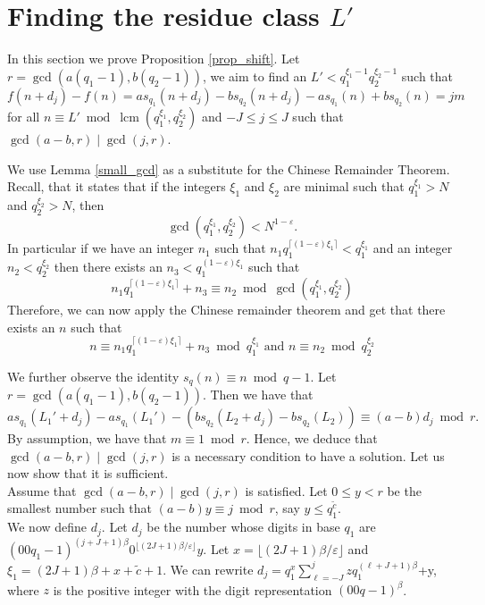 \documentclass[12pt]{amsart}
\renewcommand{\leq}{\leqslant}
\DeclareMathOperator{\lcm}{lcm}
\theoremstyle{definition}
\numberwithin{equation}{section}
\numberwithin{equation}{section}
\begin{document}
\section{Finding the residue class $L'$} \label{sec_Proof_of_claims}
In this section we prove Proposition \ref{prop_shift}. Let $r= \gcd(a(q_1-1),b(q_2-1))$, we aim to find an $L'<q_1^{\xi_{1}-1}q_2^{\xi_{2}-1}$ such that
\begin{equation}\label{eq_def_f}
	f(n+d_j)-f(n) = as_{q_1}(n+d_j)-bs_{q_2}(n+d_j)-as_{q_1}(n)+bs_{q_2}(n) = jm
\end{equation}
for all $n\equiv L' \bmod \lcm(q_1^{\xi_{1}},q_2^{\xi_{2}})$ and $-J\leq j \leq J$ such that $\gcd(a-b,r)\mid\gcd(j,r)$.

We use Lemma \ref{small_gcd} as a substitute for the Chinese Remainder Theorem. Recall, that it states that if the integers $\xi_1$ and $\xi_2$ are minimal such that $q_1^{\xi_1}>N$ and $q_2^{\xi_2}>N$, then
\[
	\gcd(q_1^{\xi_1}, q_2^{\xi_2})< N^{1-\varepsilon}.
\]
In particular if we have an integer $n_1$ such that $n_1q_1^{\lceil(1-\varepsilon)\xi_1\rceil}<q_1^{\xi_1}$ and an integer $n_2<q_2^{\xi_2}$ then there exists an $n_3<q_1^{(1-\varepsilon)\xi_1}$ such that
\[
	n_1q_1^{\lceil(1-\varepsilon)\xi_1\rceil} + n_3 \equiv n_2 \bmod \gcd(q_1^{\xi_1}, q_2^{\xi_2})
\]
Therefore, we can now apply the Chinese remainder theorem and get that there exists an $n$ such that
\[ 
	n \equiv n_1q_1^{\lceil(1-\varepsilon)\xi_1\rceil}+n_3 \bmod q_1^{\xi_1} \text{ and } n \equiv n_2 \bmod q_2^{\xi_2}
\]

We further observe the identity $s_q(n)\equiv n \bmod q-1$. Let $r = \gcd(a(q_1-1), b(q_2-1))$. Then we have that
\[
as_{q_1}( L_1'+d_j)-as_{q_1}( L_1') - (bs_{q_2}( L_2+d_j)-bs_{q_2}( L_2)) \equiv (a-b)d_j \bmod r.
\]
By assumption, we have that $m\equiv 1 \bmod r$. Hence, we deduce that $\gcd(a-b, r) \mid \gcd (j, r)$ is a necessary condition to have a solution. Let us now show that it is sufficient.\\
Assume that $\gcd(a-b, r) \mid \gcd (j, r)$ is satisfied. Let $0 \leq y < r$ be the smallest number such that $(a-b)y \equiv j\bmod r$, say $y \leq q_1^{\tilde{c}}$.\\

We now define $d_j$. Let $d_j$ be the number whose digits in base $q_1$ are $(00\mathrel{{q_1}{-}{1}})^{(j+J+1)\beta}0^{\lfloor(2J+1)\beta/\varepsilon\rfloor}y$. Let $x= \lfloor(2J+1)\beta/\varepsilon\rfloor$ and $\xi_{1} = (2J+1)\beta + x + 
\tilde{c} + 1$. We can rewrite $d_j = q_1^{x}\sum_{\ell=-J}^{j}zq_1^{(\ell+J+1)\beta}$+y, where $z$ is the positive integer with the digit representation $(00\mathrel{{q}{-}{1}})^{\beta}$.\\
\end{document}
